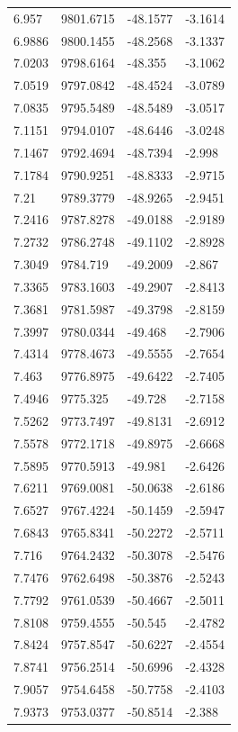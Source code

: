 \begin{table}[H]
\begin{tabular}{llll}
6.957 & 9801.6715 & -48.1577 & -3.1614 \\
6.9886 & 9800.1455 & -48.2568 & -3.1337 \\
7.0203 & 9798.6164 & -48.355 & -3.1062 \\
7.0519 & 9797.0842 & -48.4524 & -3.0789 \\
7.0835 & 9795.5489 & -48.5489 & -3.0517 \\
7.1151 & 9794.0107 & -48.6446 & -3.0248 \\
7.1467 & 9792.4694 & -48.7394 & -2.998 \\
7.1784 & 9790.9251 & -48.8333 & -2.9715 \\
7.21 & 9789.3779 & -48.9265 & -2.9451 \\
7.2416 & 9787.8278 & -49.0188 & -2.9189 \\
7.2732 & 9786.2748 & -49.1102 & -2.8928 \\
7.3049 & 9784.719 & -49.2009 & -2.867 \\
7.3365 & 9783.1603 & -49.2907 & -2.8413 \\
7.3681 & 9781.5987 & -49.3798 & -2.8159 \\
7.3997 & 9780.0344 & -49.468 & -2.7906 \\
7.4314 & 9778.4673 & -49.5555 & -2.7654 \\
7.463 & 9776.8975 & -49.6422 & -2.7405 \\
7.4946 & 9775.325 & -49.728 & -2.7158 \\
7.5262 & 9773.7497 & -49.8131 & -2.6912 \\
7.5578 & 9772.1718 & -49.8975 & -2.6668 \\
7.5895 & 9770.5913 & -49.981 & -2.6426 \\
7.6211 & 9769.0081 & -50.0638 & -2.6186 \\
7.6527 & 9767.4224 & -50.1459 & -2.5947 \\
7.6843 & 9765.8341 & -50.2272 & -2.5711 \\
7.716 & 9764.2432 & -50.3078 & -2.5476 \\
7.7476 & 9762.6498 & -50.3876 & -2.5243 \\
7.7792 & 9761.0539 & -50.4667 & -2.5011 \\
7.8108 & 9759.4555 & -50.545 & -2.4782 \\
7.8424 & 9757.8547 & -50.6227 & -2.4554 \\
7.8741 & 9756.2514 & -50.6996 & -2.4328 \\
7.9057 & 9754.6458 & -50.7758 & -2.4103 \\
7.9373 & 9753.0377 & -50.8514 & -2.388 \\

\end{tabular}
\end{table}
